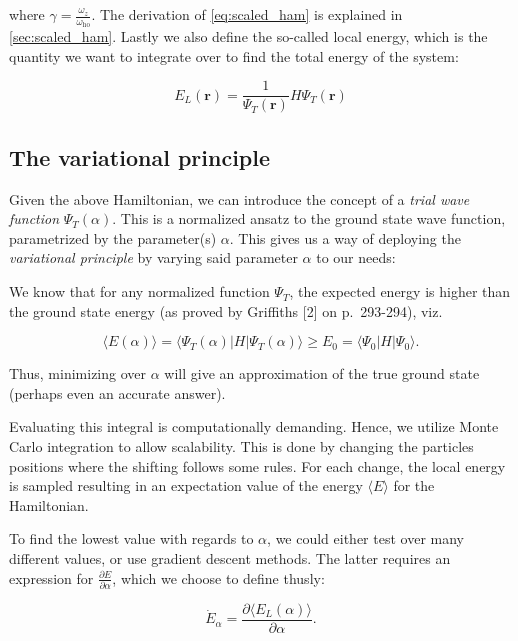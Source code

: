 \documentclass[
]{article}
\begin{document}
where \(\gamma = \frac{\omega_z}{\omega_\text{ho}}\). The derivation of
\eqref{eq:scaled_ham} is explained in \ref{sec:scaled_ham}. Lastly we
also define the so-called local energy, which is the quantity we want to
integrate over to find the total energy of the system:

\begin{equation} E_L(\mathbf r) = \frac{1}{\Psi_T(\mathbf r)}H\Psi_T(\mathbf r) \label{eq:local-energy}\end{equation}

\hypertarget{the-variational-principle}{%
\subsection{The variational principle}\label{the-variational-principle}}

Given the above Hamiltonian, we can introduce the concept of a
\emph{trial wave function} \(\Psi_T(\alpha)\). This is a normalized
ansatz to the ground state wave function, parametrized by the
parameter(s) \(\alpha\). This gives us a way of deploying the
\emph{variational principle} by varying said parameter \(\alpha\) to our
needs:

We know that for any normalized function \(\Psi_T\), the expected energy
is higher than the ground state energy (as proved by Griffiths {[}2{]}
on p.~293-294), viz.

\begin{equation} \langle E(\alpha) \rangle = \langle \Psi_T(\alpha) | H | \Psi_T(\alpha)\rangle \ge E_0 = \langle \Psi_0 | H | \Psi_0\rangle. \label{eq:variational-principle}\end{equation}

Thus, minimizing over \(\alpha\) will give an approximation of the true
ground state (perhaps even an accurate answer).

Evaluating this integral is computationally demanding. Hence, we utilize
Monte Carlo integration to allow scalability. This is done by changing
the particles positions where the shifting follows some rules. For each
change, the local energy is sampled resulting in an expectation value of
the energy \(\langle E\rangle\) for the Hamiltonian.

To find the lowest value with regards to \(\alpha\), we could either
test over many different values, or use gradient descent methods. The
latter requires an expression for
\(\frac{\partial E}{\partial \alpha}\), which we choose to define
thusly:

\[ \dot E_\alpha = \frac{\partial \langle E_L(\alpha)\rangle}{\partial \alpha} .\]
\end{document}
